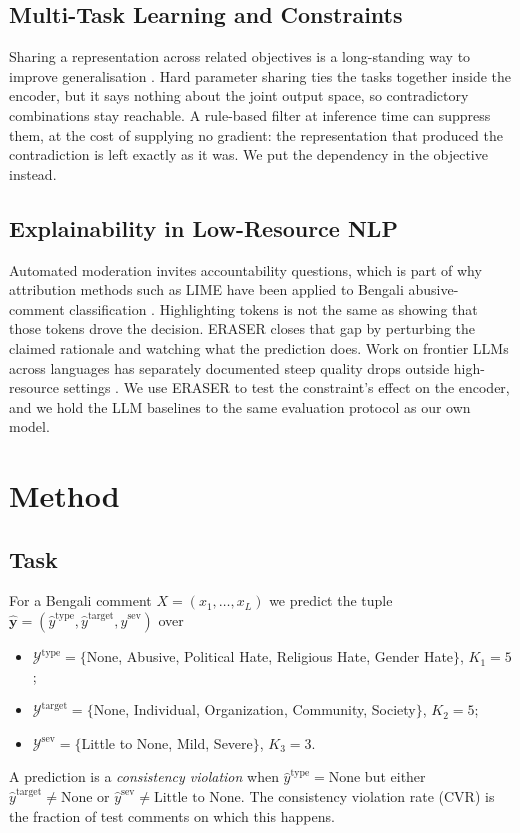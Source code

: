 \documentclass[conference]{IEEEtran}
\begin{document}
\subsection{Multi-Task Learning and Constraints}
Sharing a representation across related objectives is a long-standing way to improve generalisation \cite{caruana1997multitask, liu2019mt}. Hard parameter sharing ties the tasks together inside the encoder, but it says nothing about the joint output space, so contradictory combinations stay reachable. A rule-based filter at inference time can suppress them, at the cost of supplying no gradient: the representation that produced the contradiction is left exactly as it was. We put the dependency in the objective instead.

\subsection{Explainability in Low-Resource NLP}
Automated moderation invites accountability questions, which is part of why attribution methods such as LIME \cite{ribeiro2016why} have been applied to Bengali abusive-comment classification \cite{ashraf2026arrogant, karim2020deephateexplainer}. Highlighting tokens is not the same as showing that those tokens drove the decision. ERASER \cite{deyoung2020eraser} closes that gap by perturbing the claimed rationale and watching what the prediction does. Work on frontier LLMs across languages has separately documented steep quality drops outside high-resource settings \cite{ahuja2023mega}. We use ERASER to test the constraint's effect on the encoder, and we hold the LLM baselines to the same evaluation protocol as our own model.

\section{Method}
\label{sec:method}

\subsection{Task}
For a Bengali comment $X = (x_1, \dots, x_L)$ we predict the tuple $\hat{\mathbf{y}} = (\hat{y}^{\text{type}}, \hat{y}^{\text{target}}, \hat{y}^{\text{sev}})$ over
\begin{itemize}
    \item $\mathcal{Y}^{\text{type}} = \{$None, Abusive, Political Hate, Religious Hate, Gender Hate$\}$, $K_1 = 5$;
    \item $\mathcal{Y}^{\text{target}} = \{$None, Individual, Organization, Community, Society$\}$, $K_2 = 5$;
    \item $\mathcal{Y}^{\text{sev}} = \{$Little to None, Mild, Severe$\}$, $K_3 = 3$.
\end{itemize}
A prediction is a \emph{consistency violation} when $\hat{y}^{\text{type}} = \text{None}$ but either $\hat{y}^{\text{target}} \neq \text{None}$ or $\hat{y}^{\text{sev}} \neq \text{Little to None}$. The consistency violation rate (CVR) is the fraction of test comments on which this happens.
\end{document}
